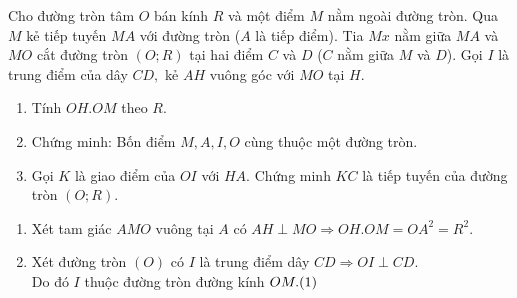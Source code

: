 \begin{ex}%
    Cho đường tròn tâm $O$ bán kính $R$ và một điểm $M$ nằm ngoài đường tròn. Qua $M$ kẻ tiếp tuyến $MA$ với đường tròn ($A$ là tiếp điểm). Tia $Mx$ nằm giữa $MA$ và $MO$ cắt đường tròn $(O; R)$ tại hai điểm $C$ và $D$ ($C$ nằm giữa $M$ và $D$). Gọi $I$ là trung điểm của dây $CD,$ kẻ $AH$ vuông góc với $MO$ tại $H.$ 
    \begin{enumerate}
    	\item Tính $OH. OM $ theo $R. $
    	\item Chứng minh: Bốn điểm $M, A, I, O $ cùng thuộc một đường tròn. 
    	\item Gọi $K$ là giao điểm của $OI$ với $HA.$ Chứng minh $KC$ là tiếp tuyến của đường tròn $(O; R).$
    \end{enumerate}
\loigiai
    {
    	\begin{center}
    	\end{center}
    \begin{enumerate}
    	\item Xét tam giác $AMO $ vuông tại $A$ có $AH \perp  MO \Rightarrow OH.OM = OA^2 = R^2. $
       	\item Xét đường tròn $(O) $ có $I$ là trung điểm dây $CD \Rightarrow OI \perp CD. $\\
       	Do đó $ I $ thuộc đường tròn đường kính $ OM.\hfill(1)$ \\

\end{enumerate}}
\end{ex}
